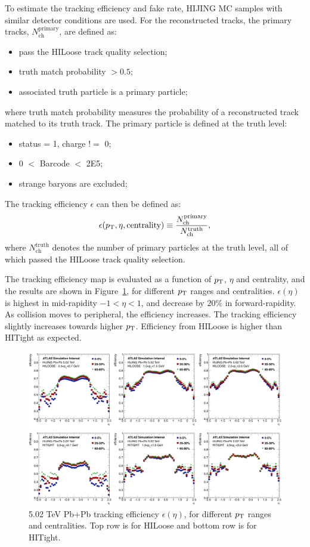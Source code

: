 To estimate the tracking efficiency and fake rate, HIJING MC samples with similar detector conditions are used. For the reconstructed tracks, the primary tracks, $N_\text{ch}^\text{primary}$, are defined as:
\begin{itemize}
\item pass the HILoose track quality selection;
\item truth match probability $>0.5$;
\item associated truth particle is a primary particle;
\end{itemize}
where truth match probability measures the probability of a reconstructed track matched to its truth track. The primary particle is defined at the truth level:
\begin{itemize}
\item status = 1, charge $!=$ 0;
\item 0 $<$ Barcode $<$ 2E5;
\item strange baryons are excluded;
\end{itemize}

The tracking efficiency $\epsilon$ can then be defined as:
\begin{equation}
\epsilon(p_\text{T}, \eta, \text{centrality}) \equiv \frac{N_\text{ch}^\text{primary}}{N_\text{ch}^\text{truth}},
\end{equation}
where $N_\text{ch}^\text{truth}$ denotes the number of primary particles at the truth level, all of which passed the HILoose track quality selection.

The tracking efficiency map is evaluated as a function of $p_\text{T}$, $\eta$ and centrality, and the results are shown in Figure~\ref{fig:detector_ATLAS_track_eff_PbPb502}, for different $p_\text{T}$ ranges and centralities. $\epsilon(\eta)$ is highest in mid-rapidity $-1<\eta<1$, and decrease by $20\%$ in forward-rapidity. As collision moves to peripheral, the efficiency increases. The tracking efficiency slightly increases towards higher $p_\text{T}$. Efficiency from HILoose is higher than HITight as expected.

\begin{figure}[H]
\centering
\includegraphics[width=.95\linewidth]{figs/chapter_detector/ATLAS_track_eff_PbPb502.png}
\caption{5.02 TeV Pb+Pb tracking efficiency $\epsilon(\eta)$, for different $p_\text{T}$ ranges and centralities. Top row is for HILoose and bottom row is for HITight.}
\label{fig:detector_ATLAS_track_eff_PbPb502}
\end{figure}

